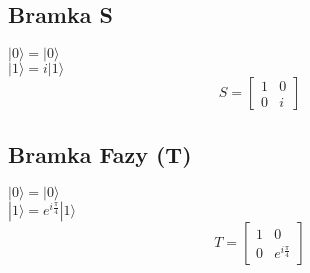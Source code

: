 \documentclass[12pt]{article}
\begin{document}
\subsection{Bramka S}
$|0\rangle = |0\rangle$ \\
$|1\rangle = i|1\rangle$
\[S =
\begin{bmatrix}
    1 & 0 \\
    0 & i
\end{bmatrix}
\]

\subsection{Bramka Fazy (T)}
$|0\rangle = |0\rangle$ \\
$|1\rangle = e^{i\frac{\pi}{4}}|1\rangle$
\[T =
\begin{bmatrix}
    1 & 0 \\
    0 & e^{i\frac{\pi}{4}}
\end{bmatrix}
\]
\end{document}
